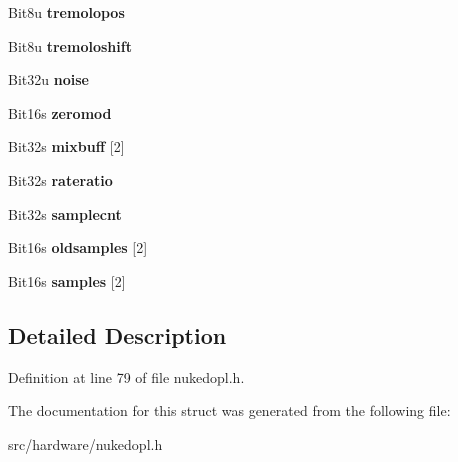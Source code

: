 \begin{DoxyCompactItemize}
\item 
\hypertarget{structopl3__chip_a66f313e04732df44830f6c87195fbfa1}{Bit8u {\bfseries tremolopos}}\label{structopl3__chip_a66f313e04732df44830f6c87195fbfa1}

\item 
\hypertarget{structopl3__chip_a0a69b026989a80b2906e860290df62e3}{Bit8u {\bfseries tremoloshift}}\label{structopl3__chip_a0a69b026989a80b2906e860290df62e3}

\item 
\hypertarget{structopl3__chip_ad502e27d10bbd5005d755e626ac43271}{Bit32u {\bfseries noise}}\label{structopl3__chip_ad502e27d10bbd5005d755e626ac43271}

\item 
\hypertarget{structopl3__chip_a7f82ed833f597f079bbc6daee147d2cc}{Bit16s {\bfseries zeromod}}\label{structopl3__chip_a7f82ed833f597f079bbc6daee147d2cc}

\item 
\hypertarget{structopl3__chip_afabb5f4f857f7ec8d385a6c12358d56d}{Bit32s {\bfseries mixbuff} \mbox{[}2\mbox{]}}\label{structopl3__chip_afabb5f4f857f7ec8d385a6c12358d56d}

\item 
\hypertarget{structopl3__chip_a77091d89b7e5819fe9b88ecda9dd8370}{Bit32s {\bfseries rateratio}}\label{structopl3__chip_a77091d89b7e5819fe9b88ecda9dd8370}

\item 
\hypertarget{structopl3__chip_a67a1edd090124d3a3b9a045973f57e38}{Bit32s {\bfseries samplecnt}}\label{structopl3__chip_a67a1edd090124d3a3b9a045973f57e38}

\item 
\hypertarget{structopl3__chip_ad103df56116f34999e06ad02260901ce}{Bit16s {\bfseries oldsamples} \mbox{[}2\mbox{]}}\label{structopl3__chip_ad103df56116f34999e06ad02260901ce}

\item 
\hypertarget{structopl3__chip_a8fb4fb634261b18528a2cf0331a00aa0}{Bit16s {\bfseries samples} \mbox{[}2\mbox{]}}\label{structopl3__chip_a8fb4fb634261b18528a2cf0331a00aa0}

\end{DoxyCompactItemize}


\subsection{Detailed Description}


Definition at line 79 of file nukedopl.\-h.



The documentation for this struct was generated from the following file\-:\begin{DoxyCompactItemize}
\item 
src/hardware/nukedopl.\-h\end{DoxyCompactItemize}
